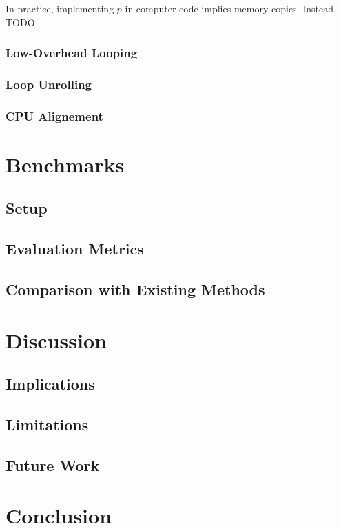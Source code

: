 \documentclass[10pt]{article}
\begin{document}
In practice, implementing \( p \) in computer code implies memory copies. Instead, TODO

\subsubsection{Low-Overhead Looping}

\subsubsection{Loop Unrolling}

\subsubsection{CPU Alignement}


\section{Benchmarks}
\subsection{Setup}
\subsection{Evaluation Metrics}
\subsection{Comparison with Existing Methods}

\section{Discussion}
\subsection{Implications}
\subsection{Limitations}
\subsection{Future Work}

\section{Conclusion}



\end{document}
